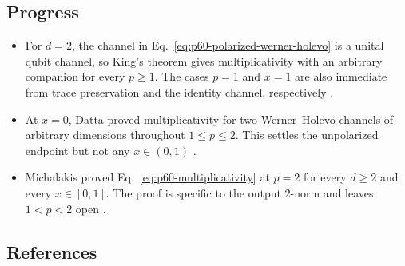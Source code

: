 \subsection*{Progress}

\begin{itemize}
  \item For $d=2$, the channel in
  Eq.~\eqref{eq:p60-polarized-werner-holevo} is a unital qubit channel, so
  King's theorem gives multiplicativity with an arbitrary companion for every
  $p\geq1$.  The cases $p=1$ and $x=1$ are also immediate from trace
  preservation and the identity channel, respectively
  .

  \item At $x=0$, Datta proved multiplicativity for two Werner--Holevo
  channels of arbitrary dimensions throughout $1\leq p\leq2$.  This settles
  the unpolarized endpoint but not any $x\in(0,1)$
  .

  \item Michalakis proved Eq.~\eqref{eq:p60-multiplicativity} at $p=2$ for
  every $d\geq2$ and every $x\in[0,1]$.  The proof is specific to the output
  $2$-norm and leaves $1<p<2$ open
  .
\end{itemize}

\subsection*{References}

